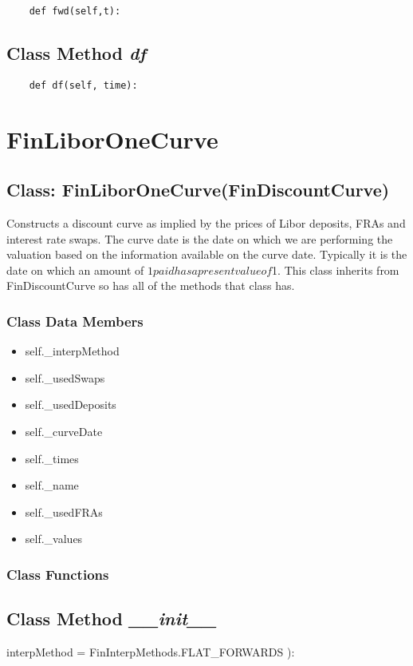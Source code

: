 \documentclass[twoside,11pt]{book}
\begin{document}
\begin{lstlisting}
    def fwd(self,t):
\end{lstlisting}

\subsection{Class Method {\it df}}


\begin{lstlisting}
    def df(self, time):
\end{lstlisting}

\newpage
\section{FinLiborOneCurve}

\subsection{Class: FinLiborOneCurve(FinDiscountCurve)}
Constructs a discount curve as implied by the prices of Libor deposits, FRAs and interest rate swaps. The curve date is the date on which we are performing the valuation based on the information available on the curve date. Typically it is the date on which an amount of $1 paid has a present value of $1. This class inherits from FinDiscountCurve so has all of the methods that class has. 

\subsubsection{Class Data Members}
\begin{itemize}
\item{self.\_interpMethod}
\item{self.\_usedSwaps}
\item{self.\_usedDeposits}
\item{self.\_curveDate}
\item{self.\_times}
\item{self.\_name}
\item{self.\_usedFRAs}
\item{self.\_values}
\end{itemize}

\subsubsection{Class Functions}

\subsection{Class Method {\it \_\_init\_\_}}
interpMethod = FinInterpMethods.FLAT\_FORWARDS ):
\end{document}

